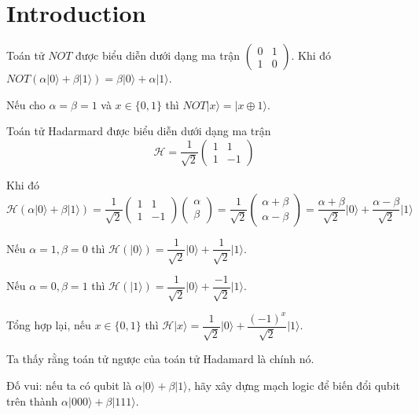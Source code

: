 \section{Introduction}

Toán tử $NOT$ được biểu diễn dưới dạng ma trận $\begin{pmatrix}
    0 & 1 \\ 1 & 0
\end{pmatrix}$. Khi đó $NOT(\alpha \lvert 0 \rangle + \beta \lvert 1 \rangle) = \beta \lvert 0 \rangle + \alpha \lvert 1 \rangle$.

Nếu cho $\alpha = \beta = 1$ và $x \in \{0, 1\}$ thì $NOT \lvert x \rangle = \lvert x \oplus 1 \rangle$.

Toán tử Hadarmard được biểu diễn dưới dạng ma trận \[ \mathcal{H} = \frac{1}{\sqrt{2}} \begin{pmatrix}
    1 & 1 \\ 1 & -1
\end{pmatrix} \]

Khi đó \[ \mathcal{H} (\alpha \lvert 0 \rangle + \beta \lvert 1 \rangle) = \frac{1}{\sqrt{2}} \begin{pmatrix}
    1 & 1 \\ 1 & - 1
\end{pmatrix} \begin{pmatrix}
    \alpha \\ \beta
\end{pmatrix} = \frac{1}{\sqrt{2}} \begin{pmatrix}
    \alpha + \beta \\ \alpha - \beta
\end{pmatrix} = \frac{\alpha + \beta}{\sqrt{2}} \lvert 0 \rangle + \frac{\alpha - \beta}{\sqrt{2}} \lvert 1 \rangle \]

Nếu $\alpha = 1, \beta = 0$ thì $\mathcal{H} (\lvert 0 \rangle) = \dfrac{1}{\sqrt{2}} \lvert 0 \rangle + \dfrac{1}{\sqrt{2}} \lvert 1 \rangle$.

Nếu $\alpha = 0, \beta = 1$ thì $\mathcal{H} (\lvert 1 \rangle) = \dfrac{1}{\sqrt{2}} \lvert 0 \rangle + \dfrac{-1}{\sqrt{2}} \lvert 1 \rangle$.

Tổng hợp lại, nếu $x \in \{0, 1\}$ thì $\mathcal{H} \lvert x \rangle = \dfrac{1}{\sqrt{2}} \lvert 0 \rangle + \dfrac{(-1)^x}{\sqrt{2}} \lvert 1 \rangle$.

Ta thấy rằng toán tử ngược của toán tử Hadamard là chính nó.

Đố vui: nếu ta có qubit là $\alpha \lvert 0 \rangle + \beta \lvert 1 \rangle$, hãy xây dựng mạch logic để biến đổi qubit trên thành $\alpha \lvert 000 \rangle + \beta \lvert 111 \rangle$.

